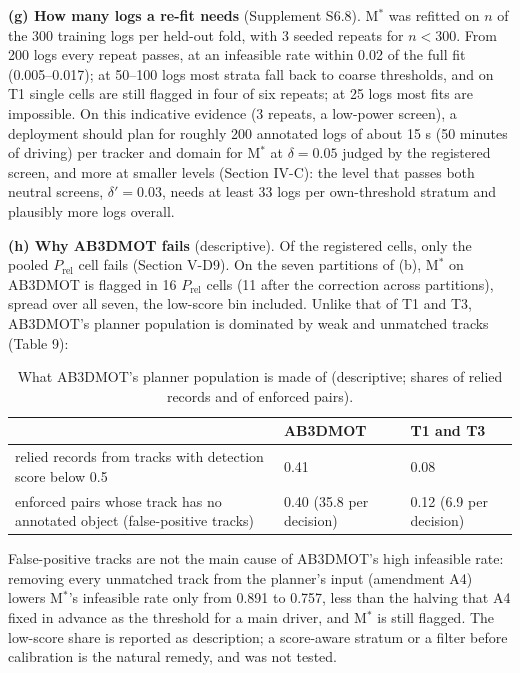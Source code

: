 \documentclass{ieeeaccess}
\begin{document}
\textbf{(g) How many logs a re-fit needs} (Supplement S6.8). M$^{*}$ was refitted on $n$ of the 300 training logs per held-out fold, with 3 seeded repeats for $n < 300$. From 200 logs every repeat passes, at an infeasible rate within 0.02 of the full fit (0.005--0.017); at 50--100 logs most strata fall back to coarse thresholds, and on T1 single cells are still flagged in four of six repeats; at 25 logs most fits are impossible. On this indicative evidence (3 repeats, a low-power screen), a deployment should plan for roughly 200 annotated logs of about 15 s (50 minutes of driving) per tracker and domain for M$^{*}$ at $\delta = 0.05$ judged by the registered screen, and more at smaller levels (Section IV-C): the level that passes both neutral screens, $\delta' = 0.03$, needs at least 33 logs per own-threshold stratum and plausibly more logs overall.

\textbf{(h) Why AB3DMOT fails} (descriptive). Of the registered cells, only the pooled $P_{\mathrm{rel}}$ cell fails (Section V-D9). On the seven partitions of (b), M$^{*}$ on AB3DMOT is flagged in 16 $P_{\mathrm{rel}}$ cells (11 after the correction across partitions), spread over all seven, the low-score bin included. Unlike that of T1 and T3, AB3DMOT's planner population is dominated by weak and unmatched tracks (Table 9):

\begin{table}[!t]
\centering
\caption{What AB3DMOT's planner population is made of (descriptive; shares of relied records and of enforced pairs).}
\label{tab:9}
\footnotesize
\setlength{\tabcolsep}{3pt}
\renewcommand{\arraystretch}{1.15}
\begin{tabular}{@{}L{0.502\columnwidth}L{0.232\columnwidth}L{0.212\columnwidth}@{}}
\hline
 & AB3DMOT & T1 and T3 \\
\hline
relied records from tracks with detection score below 0.5 & 0.41 & 0.08 \\
enforced pairs whose track has no annotated object (false-positive tracks) & 0.40 (35.8 per decision) & 0.12 (6.9 per decision) \\
\hline
\end{tabular}
\end{table}

False-positive tracks are not the main cause of AB3DMOT's high infeasible rate: removing every unmatched track from the planner's input (amendment A4) lowers M$^{*}$'s infeasible rate only from 0.891 to 0.757, less than the halving that A4 fixed in advance as the threshold for a main driver, and M$^{*}$ is still flagged. The low-score share is reported as description; a score-aware stratum or a filter before calibration is the natural remedy, and was not tested.
\end{document}

